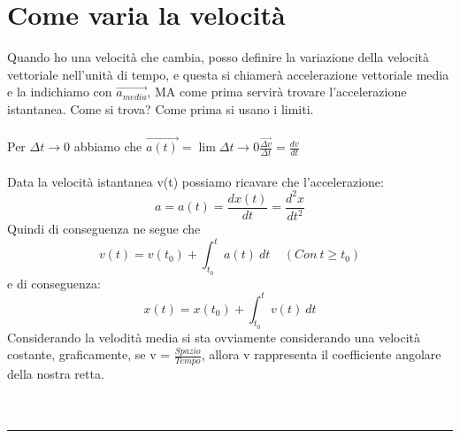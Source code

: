 \documentclass[12pt, a4paper, openany, oneside]{book}
\begin{document}
\section{Come varia la velocità}
Quando ho una velocità che cambia, posso definire la variazione della velocità 
vettoriale nell'unità di tempo, e questa si chiamerà accelerazione vettoriale media
e la indichiamo con $\vec{a_{media}}$, MA come prima servirà trovare l'accelerazione 
istantanea. Come si trova? Come prima si usano i limiti.
\\ \\
Per $\Delta t \to 0$ abbiamo che $\vec{a(t)} = \lim{\Delta t \to 0} 
\frac{\vec{\Delta v}}{\Delta t} = \frac{dv}{dt} $
\\ \\
Data la velocità istantanea v(t) possiamo ricavare che l'accelerazione: 
\[a = a(t) = \frac{d x(t)}{dt} = \frac{d^{2}x}{dt^{2}}\]
Quindi di conseguenza ne segue che 
\[v(t) = v(t_{0}) + \int_{t_{0}}^{t}a(t)~dt ~~~~~ (Con ~ t\geq t_{0}) \] e
di conseguenza: \[x(t) = x(t_{0}) + \int_{t_{0}}^{t}v(t)~dt  \]
Considerando la velodità media si sta ovviamente considerando una velocità costante, 
graficamente, se v = $\frac{Spazio}{Tempo}$, allora v rappresenta il coefficiente
angolare della nostra retta.\\ \\ 
\\
{\color{black} \rule{\linewidth}{0.3mm}}
\end{document}

